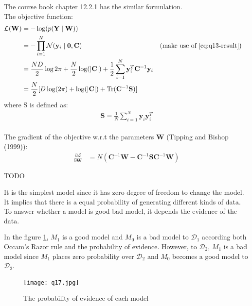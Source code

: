 \documentclass[12pt]{article}
\newenvironment{question}[2][Question]{\begin{trivlist}
\kern10pt
\item[\hskip \labelsep {\bfseries #1}\hskip \labelsep {\bfseries #2.}]}{\end{trivlist}}
\begin{document}
\begin{question}{15}
The course book chapter 12.2.1 has the similar formulation.\\
The objective function:
\begin{align*}
  \mathcal{L}(\mathbf{W}) &= -\log(p(\mathbf{Y}\mid\mathbf{W})) \\
  &= -\prod_{i=1}^{N} \mathcal{N}(\mathbf{y}_i\mid\mathbf{0}, \mathbf{C})
      && \text{(make use of \eqref{eq:q13-result})} \\
  &= \frac{ND}{2}\log{2\pi} + \frac{N}{2}\log(|\mathbf{C}|) 
     + \frac{1}{2} \sum_{i=1}^{N} \mathbf{y}_i^T \mathbf{C}^{-1}\mathbf{y}_i \\
  &= \frac{N}{2}[D\log(2\pi) + \log(|\mathbf{C}|) + \text{Tr}(\mathbf{C}^{-1}\mathbf{S})]
\end{align*}
where S is defined as:
\begin{align*}
  \mathbf{S} = \frac{1}{N}\sum_{i=1}^{N} \mathbf{y}_i\mathbf{y}_i^T
\end{align*}
\\
The gradient of the objective w.r.t the parameters $\mathbf{W}$
(Tipping and Bishop (1999)):
\begin{align*}
  \frac{\partial{\mathcal{L}}}{\partial{\mathbf{W}}} 
    &= N(\mathbf{C}^{-1}\mathbf{W} 
         - \mathbf{C}^{-1}\mathbf{S}\mathbf{C}^{-1}\mathbf{W})
\end{align*}
\end{question}

\begin{question}{16}
  TODO
\end{question}

\begin{question}{17}
It is the simplest model since it has zero degree of freedom to change the model.
It implies that there is a equal probability of generating different kinds of
data. To answer whether a model is good bad model, it depends the evidence
of the data. 

In the figure \ref{fig:q17-model-evidence}, $M_1$ is a good model and $M_0$ is a 
bad model to $\mathcal{D}_1$ according both Occam’s Razor rule and the probability
of evidence. However, to $\mathcal{D}_2$, $M_1$ is a bad model since $M_1$ places
zero probability over $\mathcal{D}_2$ and $M_0$ becomes a good model to $\mathcal{D}_2$.
\begin{figure}[h!] %
  \centering
  \texttt{[image: q17.jpg]}
  \caption{The probability of evidence of each model}
  \label{fig:q17-model-evidence}
\end{figure}
\end{question}
\end{document}
